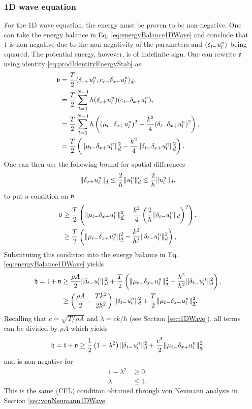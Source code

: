 {{{{\subsubsection{1D wave equation}
For the 1D wave equation, the energy must be proven to be non-negative. One can take the energy balance in Eq. \eqref{eq:energyBalance1DWave} and conclude that $\mathfrak{t}$ is non-negative due to the non-negativity of the parameters and $(\delta_{t-} u_l^n)$ being squared. The potential energy, however, is of indefinite sign. One can rewrite $\mathfrak{v}$ using identity \eqref{eq:prodIdentityEnergyStab} as
\begin{align*}
    \mathfrak{v} &= \frac{T}{2} \langle \delta_{x+} u_l^n, e_{t-}\delta_{x+} u_l^n\rangle_{\underline{d}},\\
    &= \frac{T}{2} \sum_{l=0}^{N-1} h(\delta_{x+} u_l^n)(e_{t-}\delta_{x+}u_l^n),\\
    &= \frac{T}{2} \sum_{l=0}^{N-1} h\left((\mu_{t-} \delta_{x+} u_l^n)^2 - \frac{k^2}{4}(\delta_{t-}\delta_{x+} u_l^n)^2\right),\\
    &= \frac{T}{2}\left(\lVert\mu_{t-}\delta_{x+}u_l^n\rVert_{\underline{d}}^2-\frac{k^2}{4}\lVert\delta_{t-}\delta_{x+} u_l^n\rVert_{\underline{d}}^2\right).
\end{align*}
One can then use the following bound for spatial differences \cite{theBible}
\begin{equation}\label{eq:spatialBound}
    \lVert \delta_{x+} u_l^n \rVert_{\underline{d}} \leq \frac{2}{h}\lVert u_l^n \rVert_d' \leq \frac{2}{h}\lVert u_l^n \rVert_d,
\end{equation}
to put a condition on $\mathfrak{v}$
\begin{align*}
    \mathfrak{v} &\geq \frac{T}{2}\left(\lVert\mu_{t-}\delta_{x+}u_l^n\rVert_{\underline{d}}^2 - \frac{k^2}{4}\left(\frac{2}{h}\lVert\delta_{t-}u_l^n\rVert_{d}\right)^2\right),\\
    &\geq \frac{T}{2}\left(\lVert\mu_{t-}\delta_{x+}u_l^n\rVert_{\underline{d}}^2 - \frac{k^2}{h^2}\lVert\delta_{t-}u_l^n\rVert_{d}^2\right),
\end{align*}
Substituting this condition into the energy balance in Eq. \eqref{eq:energyBalance1DWave} yields
\begin{align*}
    \mathfrak{h} = \mathfrak{t} + \mathfrak{v} &\geq \frac{\rho A}{2}\lVert\delta_{t-} u_l^n\rVert^2_d + \frac{T}{2}\left(\lVert\mu_{t-}\delta_{x+}u_l^n\rVert_{\underline{d}}^2 - \frac{k^2}{h^2}\lVert\delta_{t-}u_l^n\rVert_{d}^2\right),\\
    &\geq \left(\frac{\rho A}{2} - \frac{Tk^2}{2h^2}\right)\lVert \delta_{t-} u_l^n\rVert_d^2 + \frac{T}{2}
    \lVert\mu_{t-}\delta_{x+} u_l^n\rVert_{\underline{d}}^2.
\end{align*}
Recalling that $c = \sqrt{T /\rho A}$ and $\lambda = ck/h$ (see Section \ref{sec:1DWave}), all terms can be divided by $\rho A$ which yields
\begin{equation}
    \mathfrak{h} = \mathfrak{t} + \mathfrak{v} \geq \frac{1}{2}\left(1 - \lambda^2\right)\lVert \delta_{t-} u_l^n\rVert_d^2 + \frac{c^2}{2}
    \lVert\mu_{t-}\delta_{x+} u_l^n\rVert_{\underline{d}}^2,
\end{equation}
and is non-negative for
\begin{align*}
    1-\lambda^2 &\geq 0,\\
    \lambda &\leq 1.
\end{align*}
This is the same (CFL) condition obtained through von Neumann analysis in Section \ref{sec:vonNeumann1DWave}.

}}}}
